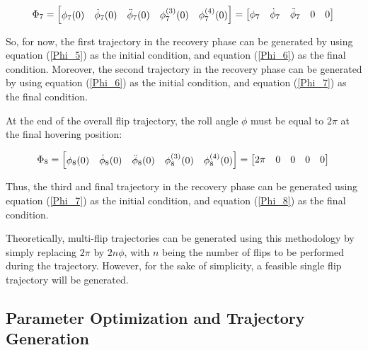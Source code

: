 \documentclass{thesisreport}
\begin{document}
\begin{itemize}
\begin{equation}\label{Phi_7}
	\Phi_7 = \begin{bmatrix}
	\phi_7(0) & \dot{\phi}_7 (0) & \ddot{\phi}_7 (0) & \phi_7^{(3)} (0) & \phi_7^{(4)} (0) \\
	\end{bmatrix} = \begin{bmatrix}
	\phi_7 & \dot{\phi}_7 & \ddot{\phi}_7 & 0 & 0
	\end{bmatrix} \\
\end{equation}

So, for now, the first trajectory in the recovery phase can be generated by using equation (\ref{Phi_5}) as the initial condition, and equation (\ref{Phi_6}) as the final condition. Moreover, the second trajectory in the recovery phase can be generated by using equation (\ref{Phi_6}) as the initial condition, and equation (\ref{Phi_7}) as the final condition.

At the end of the overall flip trajectory, the roll angle $\phi$ must be equal to $2 \pi$ at the final hovering position:

\begin{equation}\label{Phi_8}
	\Phi_8 = \begin{bmatrix}
	\phi_8(0) & \dot{\phi}_8 (0) & \ddot{\phi}_8 (0) & \phi_8^{(3)} (0) & \phi_8^{(4)} (0) \\
	\end{bmatrix} = \begin{bmatrix}
	2 \pi & 0 & 0 & 0 & 0
	\end{bmatrix} \\
\end{equation}

Thus, the third and final trajectory in the recovery phase can be generated using equation (\ref{Phi_7}) as the initial condition, and equation (\ref{Phi_8}) as the final condition.

Theoretically, multi-flip trajectories can be generated using this methodology by simply replacing $2 \pi$ by $2 n \phi$, with $n$ being the number of flips to be performed during the trajectory. However, for the sake of simplicity, a feasible single flip trajectory will be generated.

\end{itemize}


\subsection{Parameter Optimization and Trajectory Generation}
\end{document}
